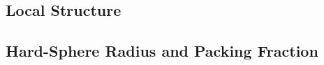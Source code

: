 \documentclass[\main/dresen_thesis.tex]{subfiles}
\renewcommand{\thisPath}{\main/chapters/looselyPackedNS/structure}
\begin{document}
  \subsection{Local Structure}
  
    \FloatBarrier

  \subsection{Hard-Sphere Radius and Packing Fraction}
  
    \FloatBarrier
\end{document}
